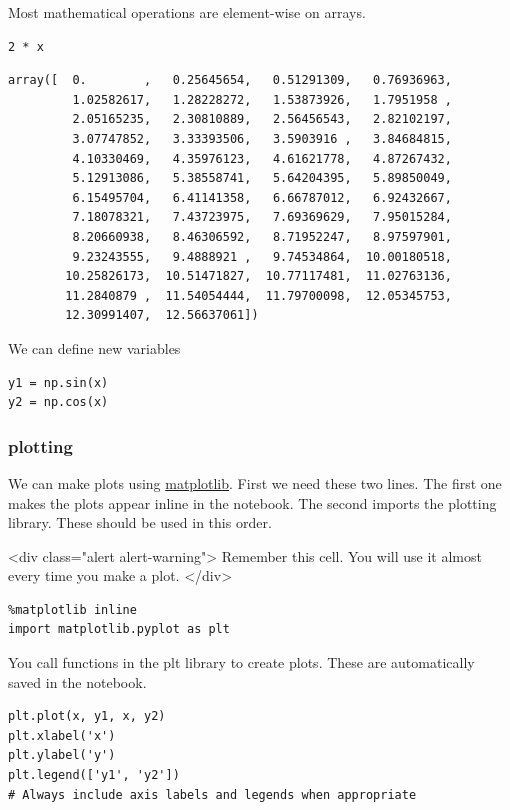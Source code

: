 \documentclass[11pt]{article}
\begin{document}
Most mathematical operations are element-wise on arrays.

\begin{verbatim}
2 * x
\end{verbatim}

\begin{verbatim}
array([  0.        ,   0.25645654,   0.51291309,   0.76936963,
         1.02582617,   1.28228272,   1.53873926,   1.7951958 ,
         2.05165235,   2.30810889,   2.56456543,   2.82102197,
         3.07747852,   3.33393506,   3.5903916 ,   3.84684815,
         4.10330469,   4.35976123,   4.61621778,   4.87267432,
         5.12913086,   5.38558741,   5.64204395,   5.89850049,
         6.15495704,   6.41141358,   6.66787012,   6.92432667,
         7.18078321,   7.43723975,   7.69369629,   7.95015284,
         8.20660938,   8.46306592,   8.71952247,   8.97597901,
         9.23243555,   9.4888921 ,   9.74534864,  10.00180518,
        10.25826173,  10.51471827,  10.77117481,  11.02763136,
        11.2840879 ,  11.54054444,  11.79700098,  12.05345753,
        12.30991407,  12.56637061])
\end{verbatim}

We can define new variables
\begin{verbatim}
y1 = np.sin(x)
y2 = np.cos(x)
\end{verbatim}

\subsubsection{plotting}
\label{sec:org693999b}

We can make plots using \href{https://matplotlib.org}{matplotlib}. First we need these two lines. The first one makes the plots appear inline in the notebook. The second imports the plotting library. These should be used in this order.

<div class="alert alert-warning">
Remember this cell. You will use it almost every time you make a plot.
</div>
\begin{verbatim}
%matplotlib inline
import matplotlib.pyplot as plt
\end{verbatim}

You call functions in the plt library to create plots. These are automatically saved in the notebook.

\begin{verbatim}
plt.plot(x, y1, x, y2)
plt.xlabel('x')
plt.ylabel('y')
plt.legend(['y1', 'y2'])
# Always include axis labels and legends when appropriate
\end{verbatim}
\end{document}
